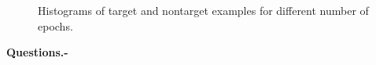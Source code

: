\documentclass[a4paper]{article}
\begin{document}
\begin{figure}[H]
    \centering
    \qquad
    \caption{Histograms of target and nontarget examples for different number of epochs.}%
    \label{fig:comp:hists}%
\end{figure}

\textbf{Questions.-}
\end{document}
